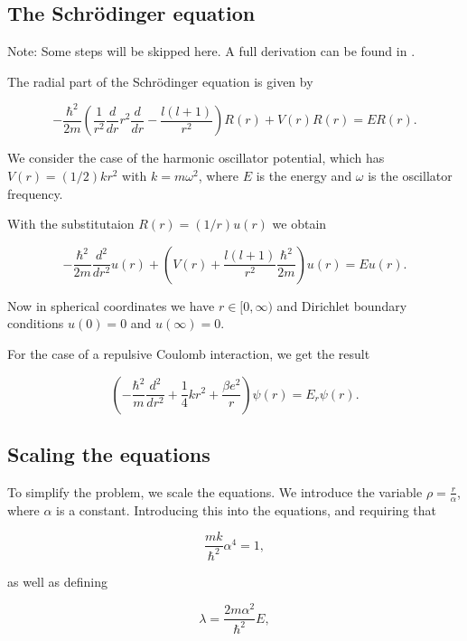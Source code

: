\documentclass{emulateapj}
\begin{document}
\subsection{The Schrödinger equation}

Note: Some steps will be skipped here. A full derivation can be found in \cite{Project}.

The radial part of the Schrödinger equation is given by

\begin{equation}
  -\frac{\hbar^2}{2 m} \left ( \frac{1}{r^2} \frac{d}{dr} r^2
  \frac{d}{dr} - \frac{l (l + 1)}{r^2} \right )R(r)
     + V(r) R(r) = E R(r).
\end{equation}

We consider the case of the harmonic oscillator potential, which has $V(r) = (1/2)kr^2$ with $k=m\omega^2$, where $E$ is the energy and $\omega$ is the oscillator frequency.

With the substitutaion $R(r) = (1/r) u(r)$ we obtain

\begin{equation}
  -\frac{\hbar^2}{2 m} \frac{d^2}{dr^2} u(r)
       + \left ( V(r) + \frac{l (l + 1)}{r^2}\frac{\hbar^2}{2 m}
                                    \right ) u(r)  = E u(r) .
\end{equation}

Now in spherical coordinates we have $r\in [0,\infty)$ and Dirichlet boundary conditions $u(0)=0$ and $u(\infty)=0$.

For the case of a repulsive Coulomb interaction, we get the result

\begin{equation}
\left(  -\frac{\hbar^2}{m} \frac{d^2}{dr^2}+ \frac{1}{4}k r^2+\frac{\beta e^2}{r}\right)\psi(r)  = E_r \psi(r).
\end{equation}

\subsection{Scaling the equations}
To simplify the problem, we scale the equations. We introduce the variable $\rho = \frac{r}{\alpha}$, where $\alpha$ is a constant. Introducing this into the equations, and requiring that

\begin{equation}
\frac{mk}{\hbar^2} \alpha^4 = 1,
\end{equation}

 as well as defining

 \begin{equation}
\lambda = \frac{2m\alpha^2}{\hbar^2}E,
\end{equation}
\end{document}

